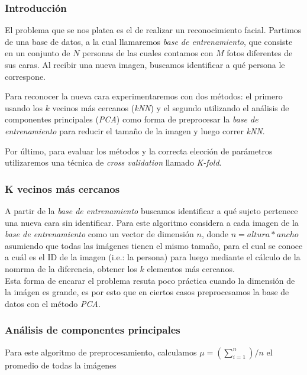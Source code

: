 \subsubsection*{Introducción}
\par El problema que se nos platea es el de realizar un reconocimiento facial. Partimos de una base de datos, a la cual llamaremos \textit{base de entrenamiento},
que consiste en un conjunto de $N$ personas de las cuales contamos con $M$ fotos diferentes de sus caras. Al recibir una nueva imagen, buscamos identificar
a qu\'e persona le correspone. 
\par Para reconocer la nueva cara experimentaremos con dos m\'etodos: el primero usando los $k$ vecinos m\'as cercanos (\textit{kNN}) y 
el segundo utilizando el an\'alisis de componentes principales (\textit{PCA}) como forma de preprocesar la \textit{base de entrenamiento} para reducir el 
tama\~{n}o de la imagen y luego correr \textit{kNN}. 
\par Por \'ultimo, para evaluar los m\'etodos y la correcta elecci\'on de par\'ametros utilizaremos una t\'ecnica de \textit{cross validation} llamado
\textit{K-fold}.

\subsubsection*{K vecinos m\'as cercanos}
A partir de la \textit{base de entrenamiento} buscamos identificar a qu\'e sujeto pertenece una nueva cara sin identificar.
Para este algoritmo considera a cada imagen de la \textit{base de entrenamiento} como un vector de dimensi\'on $n$, donde $n = altura*ancho$ asumiendo que
todas las im\'agenes tienen el mismo tama\~no, para el cual se conoce a cu\'al es el ID de la imagen (i.e.: la persona) para luego mediante el c\'alculo
de la nomrma de la diferencia, obtener los $k$ elementos m\'as cercanos.\\
Esta forma de encarar el problema resuta poco pr\'actica cuando la dimensi\'on de la im\'agen es grande, es por esto que en ciertos casos preprocesamos
la base de datos con el m\'etodo \textit{PCA}.


\subsubsection*{An\'alisis de componentes principales}
Para este algoritmo de preprocesamiento, calculamos $\mu = (\sum_{i=1}^{n})/n$ el promedio de todas la im\'agenes